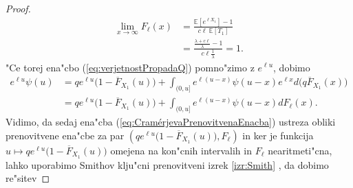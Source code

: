 \documentclass[12pt, a4paper, reqno]{amsart}
\theoremstyle{definition}
\theoremstyle{plain}
\newcommand{\E}{\mathbb{E}}
\newcommand{\1}{\mathds{1}}
\newcommand*{\refPriloga}[1]{%
  \begingroup
    \hypersetup{
      linkcolor=red,
      linkbordercolor=red,
    }%
    \ref{#1}%
  \endgroup
}
\begin{document}
\begin{proof}
                \begin{align*}
                    \lim_{x\to\infty}F_\ell(x)  &= \frac{\E\left[e^{\ell X_1}\right] - 1}{c\ell\ \E\left[T_1\right]}\\
                                                &= \frac{\frac{\lambda + c\ell}{\lambda} - 1}{c\ell \frac{1}{\lambda}} = 1.
                \end{align*}
                "Ce torej ena"cbo (\ref{eq:verjetnostPropadaQ}) pomno"zimo z $e^{\ell u}$, dobimo
                \begin{align}
                    e^{\ell u}\psi(u)   &= qe^{\ell u}\bigl(1 - \overline{F}_{X_1}(u)\bigr) + \int_{(0, u]}e^{\ell (u - x)}\psi(u - x)e^{\ell x}d\bigl(q\overline{F}_{X_1}(x)\bigr) \nonumber \\
                                        &= qe^{\ell u}\bigl(1 - \overline{F}_{X_1}(u)\bigr) + \int_{(0, u]}e^{\ell (u - x)}\psi(u - x)dF_\ell(x). \label{eq:CramérjevaPrenovitvenaEnacba}
                \end{align}
                Vidimo, da sedaj ena"cba (\ref{eq:CramérjevaPrenovitvenaEnacba}) ustreza obliki prenovitvene ena"cbe za par \newline $\left(qe^{\ell u}\bigl(1 - \overline{F}_{X_1}(u)\bigr), F_\ell\right)$
                in ker je funkcija $u\mapsto qe^{\ell u}\bigl(1 - \overline{F}_{X_1}(u)\bigr)$ omejena na kon"cnih 
                intervalih in $F_\ell$ nearitmeti"cna, lahko uporabimo Smithov klju"cni prenovitveni izrek \refPriloga{izr:Smith}, da dobimo
                re"sitev
                

\end{proof}
\end{document}
